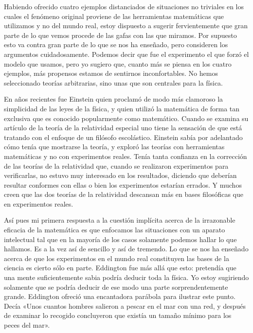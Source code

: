 \documentclass[a4paper, 12pt]{article}
\begin{document}
 

Habiendo ofrecido cuatro ejemplos distanciados de situaciones no triviales en los cuales el fenómeno original proviene de las herramientas matemáticas que utilizamos y no del mundo real, estoy dispuesto a sugerir fervientemente que gran parte de lo que vemos procede de las gafas con las que miramos. Por supuesto esto va contra gran parte de lo que se nos ha enseñado, pero consideren los argumentos cuidadosamente. Podemos decir que fue el experimento el que forzó el modelo que usamos, pero yo sugiero que, cuanto más se piensa en los cuatro ejemplos, más propensos estamos de sentirnos inconfortables. No hemos seleccionado teorías arbitrarias, sino unas que son centrales para la física.

 

En años recientes fue Einstein quien proclamó de modo más clamoroso la simplicidad de las leyes de la física, y quien utilizó la matemática de forma tan exclusiva que es conocido popularmente como matemático. Cuando se examina su artículo de la teoría de la relatividad especial  uno tiene la sensación de que está tratando con el enfoque de un filósofo escolástico. Einstein sabía por adelantado cómo tenía que mostrarse la teoría, y exploró las teorías con herramientas matemáticas y no con experimentos reales. Tenía tanta confianza en la corrección de las teorías de la relatividad que, cuando se realizaron experimentos para verificarlas, no estuvo muy interesado en los resultados, diciendo que deberían resultar conformes con ellas o bien los experimentos estarían errados. Y muchos creen que las dos teorías de la relatividad descansan más en bases filosóficas que en experimentos reales.

 

Así pues mi primera respuesta a la cuestión implícita acerca de la irrazonable eficacia de la matemática es que enfocamos las situaciones con un aparato intelectual tal que en la mayoría de los casos solamente podemos hallar lo que hallamos.  Es a la vez así de sencillo y así de tremendo. Lo que se nos ha enseñado acerca de que los experimentos en el mundo real constituyen las bases de la ciencia es cierto sólo en parte. Eddington fue más allá que esto: pretendía que una mente suficientemente sabia podría deducir toda la física. Yo estoy sugiriendo solamente que se podría deducir de ese modo una parte sorprendentemente grande. Eddington ofreció una encantadora parábola para ilustrar este punto. Decía «Unos cuantos hombres salieron a pescar en el mar con una red, y después de examinar lo recogido concluyeron que existía un tamaño mínimo para los peces del mar».
\end{document}
